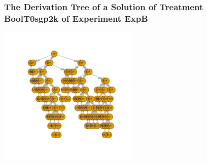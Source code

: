  \begin{frame}
 \frametitle{ The Derivation Tree of a Solution of Treatment BoolT0sgp2k of Experiment ExpB }
 \begin{center}
\includegraphics[width=0.5\textwidth, angle=0]
{ExpBDerivationTreeFigure000.pdf}
 \end{center}
 \label{report/ExpBDerivationTreeFigure000.pdf}  
 \end{frame}

